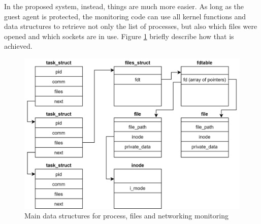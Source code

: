 \par 
In the proposed system, instead, things are much more easier. As long as the guest agent is protected, the monitoring code can use all kernel functions and data structures to retrieve not only the list of processes, but also which files were opened and which sockets are in use. Figure \ref{fig:process-list} briefly describe how that is achieved.
\begin{figure}[t]
    \centering
    \includegraphics[]{images/process-list.png}
    \caption{Main data structures for process, files and networking monitoring}
    \label{fig:process-list}
\end{figure}
